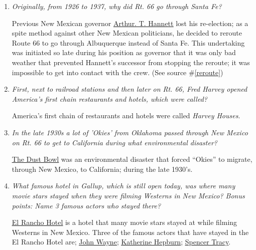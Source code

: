 \documentclass[12pt]{article}
\begin{document}
\begin{enumerate}
    \item{\textit{Originally, from 1926 to 1937, why did Rt. 66 go through Santa Fe?}}
        \begin{addmargin}[24pt]{0in}
            Previous New Mexican governor {\color{blue}\underline{\href{https://www.nga.org/governor/arthur-thomas-hannett/}{Arthur. T. Hannett}}} lost his re-election; as a spite method against other New Mexican politicians, he decided to reroute Route 66 to go through
               Albuquerque instead of Santa Fe.
            This undertaking was initiated so late during his position as governor that it was only bad weather that prevented Hannett's successor from stopping the reroute; it was impossible to get into contact with the crew.
            (See source \#\ref{reroute})
        \end{addmargin}
    \item{\textit{First, next to railroad stations and then later on Rt. 66, Fred Harvey opened America's first chain restaurants and hotels, which were called?}}
        \begin{addmargin}[24pt]{0in}
            America's first chain of restaurants and hotels were called \textit{Harvey Houses}.
        \end{addmargin}
    \item{\textit{In the late 1930s a lot of 'Okies' from Oklahoma passed through New Mexico on Rt. 66 to get to California during what environmental disaster?}}
        \begin{addmargin}[24pt]{0in}
            {\color{blue}\underline{\href{https://www.ncbi.nlm.nih.gov/pmc/articles/PMC4015056/}{The Dust Bowl}}} was an environmental disaster that forced ``Okies'' to migrate, through New Mexico, to California; during the late 1930's.
        \end{addmargin}
    \item{\textit{What famous hotel in Gallup, which is still open today, was where many movie stars stayed when they were filming Westerns in New Mexico?  Bonus points: Name 3 famous actors who stayed there?}}
        \begin{addmargin}[24pt]{0in}
            {\color{blue}\underline{\href{https://www.nps.gov/nr/travel/route66/el_rancho_hotel_gallup.html}{El Rancho Hotel}}} is a hotel that many movie stars stayed at while filming Westerns in New Mexico.
            Three of the famous actors that have stayed in the El Rancho Hotel are; {\color{blue}\underline{\href{https://www.johnwayne.com/}{John Wayne}}}; 
                {\color{blue}\underline{\href{https://www.biography.com/actor/katharine-hepburn}{Katherine Hepburn}}}; {\color{blue}\underline{\href{https://www.newworldencyclopedia.org/entry/Spencer_Tracy}{Spencer Tracy}}}.

\end{addmargin}
\end{enumerate}
\end{document}
